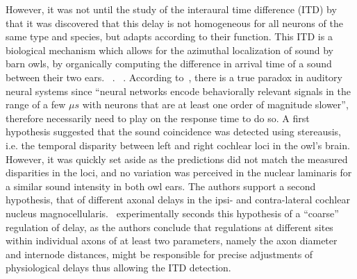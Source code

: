 \documentclass[brainsci, %
               review,submit,pdftex,moreauthors
               ]{Definitions/mdpi}
\begin{document}
However, it was not until the study of the interaural time difference (ITD) by ~\citet{carr_circuit_1990} that it was discovered that this delay is not homogeneous for all neurons of the same type and species, but adapts according to their function. This ITD is a biological mechanism which allows for the azimuthal localization of sound by barn owls, by organically computing the difference in arrival time of a sound between their two ears. ~\citep{jeffress_place_1948}. ~\citep{konishi_coding_2003}. According to~\citep{gerstner_neuronal_1996}, there is a true paradox in auditory neural systems since ``neural networks encode behaviorally relevant signals in the range of a few $\mu s$ with neurons that are at least one order of magnitude slower'', therefore necessarily need to play on the response time to do so.   A first hypothesis suggested that the sound coincidence was detected using stereausis, i.e. the temporal disparity between left and right cochlear loci in the owl's brain. However, it was quickly set aside as the predictions did not match the measured disparities in the loci, and no variation was perceived in the nuclear laminaris for a similar sound intensity in both owl ears. The authors support a second hypothesis, that of different axonal delays in the ipsi- and contra-lateral cochlear nucleus magnocellularis.~\citet{seidl_mechanisms_2010} experimentally seconds this hypothesis of a ``coarse'' regulation of delay, as the authors conclude that regulations at different sites within individual axons of at least two parameters, namely the axon diameter and internode distances, might be responsible for precise adjustments of physiological delays thus allowing the ITD detection. 
\end{document}
